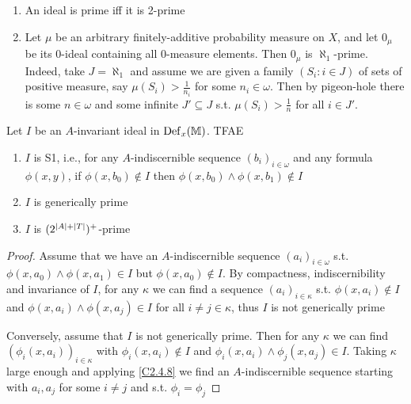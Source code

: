 \documentclass[11pt]{article}
\begin{document}
\begin{examplle}[]
\begin{enumerate}
\item An ideal is prime iff it is 2-prime
\item Let \(\mu\) be an arbitrary finitely-additive probability measure on \(X\), and let \(0_\mu\) be its
0-ideal containing all 0-measure elements. Then \(0_\mu\) is \(\aleph_1\)-prime. Indeed,
take \(J=\aleph_1\) and assume we are given a
family \((S_i:i\in J)\) of sets of positive measure, say \(\mu(S_i)>\frac{1}{n_i}\) for
some \(n_i\in\omega\). Then by pigeon-hole there is some \(n\in\omega\) and some infinite \(J'\subseteq J\)
s.t. \(\mu(S_i)>\frac{1}{n}\) for all \(i\in J'\). \label{Problem7}
\end{enumerate}
\end{examplle}

\begin{proposition}[]
\label{C3.1.7}
Let \(I\) be an \(A\)-invariant ideal in \(\operatorname{Def}_x(\mathbb{M})\). TFAE
\begin{enumerate}
\item \(I\) is S1, i.e., for any \(A\)-indiscernible sequence \((b_i)_{i\in\omega}\) and any
formula \(\phi(x,y)\), if \(\phi(x,b_0)\notin I\) then \(\phi(x,b_0)\wedge\phi(x,b_1)\notin I\)
\item \(I\) is generically prime
\item \(I\) is \((2^{\abs{A}+\abs{T}})^+\)-prime
\end{enumerate}
\end{proposition}

\begin{proof}
Assume that we have an \(A\)-indiscernible sequence \((a_i)_{i\in\omega}\) s.t. \(\phi(x,a_0)\wedge\phi(x,a_1)\in I\)
but \(\phi(x,a_0)\notin I\). By compactness, indiscernibility and invariance of \(I\), for any \(\kappa\) we can
find a sequence \((a_i)_{i\in\kappa}\) s.t. \(\phi(x,a_i)\notin I\) and \(\phi(x,a_i)\wedge\phi(x,a_j)\in I\) for
all \(i\neq j\in\kappa\), thus \(I\) is not generically prime

Conversely, assume that \(I\) is not generically prime. Then for any \(\kappa\) we can
find \((\phi_i(x,a_i))_{i\in\kappa}\) with \(\phi_i(x,a_i)\notin I\) and \(\phi_i(x,a_i)\wedge\phi_j(x,a_j)\in I\). Taking \(\kappa\) large
enough and applying \ref{C2.4.8} we find an \(A\)-indiscernible sequence starting with \(a_i,a_j\)
for some \(i\neq j\) and s.t.
\(\phi_i=\phi_j\)
\end{proof}
\end{document}
